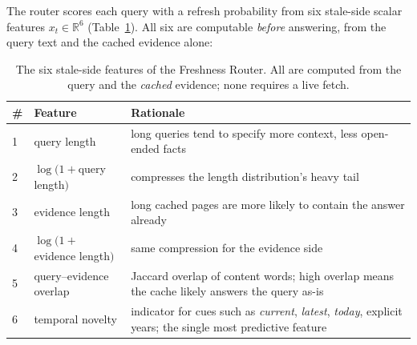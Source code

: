 \documentclass[pdflatex,sn-basic]{sn-jnl}
\begin{document}
The router scores each query with a refresh probability from six stale-side scalar features $x_t \in \mathbb{R}^{6}$ (Table~\ref{tab:features}). All six are computable \emph{before} answering, from the query text and the cached evidence alone:

\begin{table}[htbp]
\caption{The six stale-side features of the Freshness Router. All are computed from the query and the \emph{cached} evidence; none requires a live fetch.}
\label{tab:features}
\centering
\small
\begin{tabular}{llp{7.2cm}}
\toprule
\# & Feature & Rationale \\
\midrule
1 & query length & long queries tend to specify more context, less open-ended facts \\
2 & $\log(1{+}$query length$)$ & compresses the length distribution's heavy tail \\
3 & evidence length & long cached pages are more likely to contain the answer already \\
4 & $\log(1{+}$evidence length$)$ & same compression for the evidence side \\
5 & query--evidence overlap & Jaccard overlap of content words; high overlap means the cache likely answers the query as-is \\
6 & temporal novelty & indicator for cues such as \emph{current}, \emph{latest}, \emph{today}, explicit years; the single most predictive feature \\
\bottomrule
\end{tabular}
\end{table}
\end{document}
